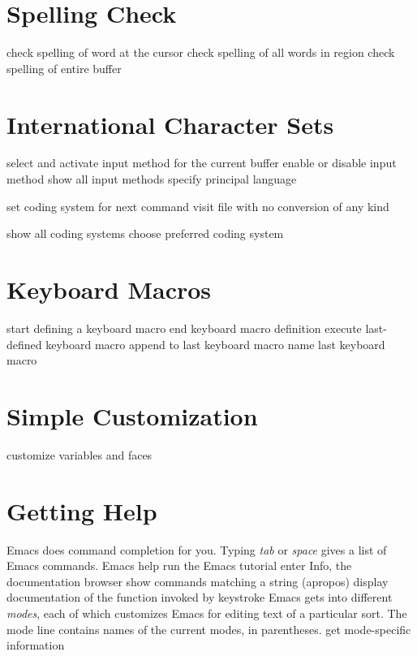 \section{Spelling Check}

 check spelling of word at the cursor
 check spelling of all words in region
 check spelling of entire buffer

\section{International Character Sets}

 select and activate input method for
  the current buffer
 enable or disable input method
 show all input methods
 specify principal language

 set coding system for next command
 visit file with no conversion
  of any kind

 show all coding systems
 choose preferred coding system

\section{Keyboard Macros}

 start defining a keyboard macro
 end keyboard macro definition
 execute last-defined keyboard macro
 append to last keyboard macro
 name last keyboard macro

\section{Simple Customization}

 customize variables and faces

\section{Getting Help}

Emacs does command completion for you. Typing 
{\it tab\/} or {\it space\/} gives a list of Emacs commands.
\askip
{} Emacs help
 run the Emacs tutorial
 enter Info, the documentation browser
 show commands matching a string (apropos)
 display documentation of the function invoked by
  keystroke
\askip
Emacs gets into different {\it modes}, each of which customizes
Emacs for editing text of a particular sort. The mode line
contains names of the current modes, in parentheses.
\askip
{} get mode-specific information

\copyrightnotice

\bye


